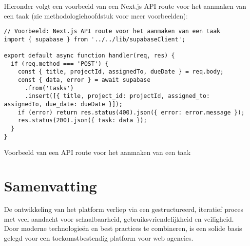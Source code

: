 Hieronder volgt een voorbeeld van een Next.js API route voor het aanmaken van een taak (zie methodologiehoofdstuk voor meer voorbeelden):

\begin{listing}[H]
\begin{verbatim}
// Voorbeeld: Next.js API route voor het aanmaken van een taak
import { supabase } from '../../lib/supabaseClient';

export default async function handler(req, res) {
  if (req.method === 'POST') {
    const { title, projectId, assignedTo, dueDate } = req.body;
    const { data, error } = await supabase
      .from('tasks')
      .insert([{ title, project_id: projectId, assigned_to: assignedTo, due_date: dueDate }]);
    if (error) return res.status(400).json({ error: error.message });
    res.status(200).json({ task: data });
  }
}
\end{verbatim}
\caption{Voorbeeld van een API route voor het aanmaken van een taak}
\end{listing}


\section{Samenvatting}
\label{sec:samenvatting}

De ontwikkeling van het platform verliep via een gestructureerd, iteratief proces met veel aandacht voor schaalbaarheid, gebruiksvriendelijkheid en veiligheid. Door moderne technologieën en best practices te combineren, is een solide basis gelegd voor een toekomstbestendig platform voor web agencies.

